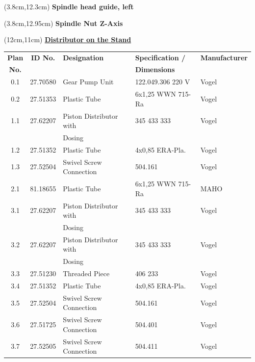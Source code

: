 \begin{textblock*}{5cm}(3.8cm,12.3cm)
    \textbf{Spindle head guide, left}
\end{textblock*}

\begin{textblock*}{5cm}(3.8cm,12.95cm)
    \textbf{Spindle Nut Z-Axis}
\end{textblock*}

\begin{textblock*}{5cm}(12cm,11cm)
    \textbf{\uline{Distributor on the Stand}}
\end{textblock*}


\begin{table}[h]
    \centering
    \renewcommand{\arraystretch}{1.2}
    \begin{tabular}{|c|c|l|l|l|}
        \hline
        \hline
        \textbf{Plan} & \textbf{ID No.} & \textbf{Designation} & \textbf{Specification /} & \textbf{Manufacturer} \\
        \textbf{No.} &&&\textbf{Dimensions}& \\
        \hline
        \hline
        0.1 & 27.70580 & Gear Pump Unit & 122.049.306 220 V & Vogel \\
        0.2 & 27.51353 & Plastic Tube & 6x1,25 WWN 715-Ra & Vogel \\

        1.1 & 27.62207 & Piston Distributor with & 345 433 333 & Vogel \\
        && Dosing && \\
        1.2 & 27.51352 & Plastic Tube & 4x0,85 ERA-Pla. & Vogel \\
        1.3 & 27.52504 & Swivel Screw Connection & 504.161 & Vogel \\
        2.1 & 81.18655 & Plastic Tube & 6x1,25 WWN 715-Ra & MAHO \\

        3.1 & 27.62207 & Piston Distributor with & 345 433 333 & Vogel \\
        && Dosing && \\
        3.2 & 27.62207 & Piston Distributor with & 345 433 333 & Vogel \\
        && Dosing && \\
        3.3 & 27.51230 & Threaded Piece & 406 233 & Vogel \\
        3.4 & 27.51352 & Plastic Tube & 4x0,85 ERA-Pla. & Vogel \\
        3.5 & 27.52504 & Swivel Screw Connection & 504.161 & Vogel \\
        3.6 & 27.51725 & Swivel Screw Connection & 504.401 & Vogel \\
        3.7 & 27.52505 & Swivel Screw Connection & 504.411 & Vogel \\
        \hline
        \hline
    \end{tabular}
\end{table}

